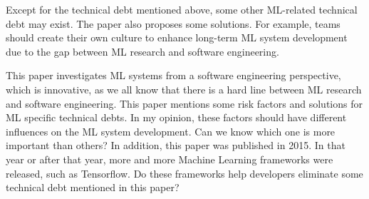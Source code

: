 \documentclass[titlepage]{article}
\begin{document}
Except for the technical debt mentioned above, some other ML-related technical debt may exist. The paper also proposes some solutions. For example, teams should create their own culture to enhance long-term ML system development due to the gap between ML research and software engineering.

This paper investigates ML systems from a software engineering perspective, which is innovative, as we all know that there is a hard line between ML research and software engineering. This paper mentions some risk factors and solutions for ML specific technical debts. In my opinion, these factors should have different influences on the ML system development. Can we know which one is more important than others? In addition, this paper was published in 2015. In that year or after that year, more and more Machine Learning frameworks were released, such as Tensorflow. Do these frameworks help developers eliminate some technical debt mentioned in this paper?
\end{document}

